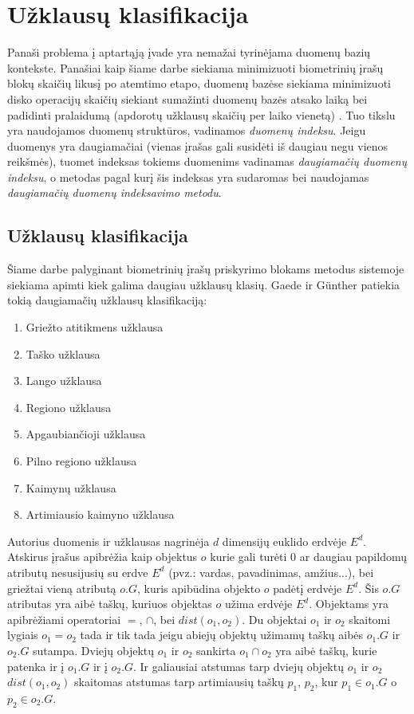 \section{Užklausų klasifikacija}

Panaši problema į aptartąją įvade yra nemažai tyrinėjama duomenų bazių kontekste.
Panašiai kaip šiame darbe siekiama minimizuoti biometrinių įrašų blokų skaičių likusį po atemtimo etapo, duomenų bazėse siekiama minimizuoti disko operacijų skaičių siekiant sumažinti duomenų bazės atsako laiką bei padidinti pralaidumą (apdorotų užklausų skaičių per laiko vienetą) \cite{garcia2000database}.
Tuo tikslu yra naudojamos duomenų struktūros, vadinamos {\it duomenų indeksu}.
Jeigu duomenys yra daugiamačiai (vienas įrašas gali susidėti iš daugiau negu vienos reikšmės), tuomet indeksas tokiems duomenims vadinamas {\it daugiamačių duomenų indeksu}, o metodas pagal kurį šis indeksas yra sudaromas bei naudojamas {\it daugiamačių duomenų indeksavimo metodu}.

\subsection{Užklausų klasifikacija}

Šiame darbe palyginant biometrinių įrašų priskyrimo blokams metodus sistemoje \cite{NeurotechnologyMegamatcherAccelerator} siekiama apimti kiek galima daugiau užklausų klasių.
Gaede ir Günther \cite{gaede1998multidimensional} patiekia tokią daugiamačių užklausų klasifikaciją:
\begin{enumerate}
	\item Griežto atitikmens užklausa
	\item Taško užklausa
	\item Lango užklausa
	\item Regiono užklausa
	\item Apgaubiančioji užklausa
	\item Pilno regiono užklausa
	\item Kaimynų užklausa
	\item Artimiausio kaimyno užklausa
\end{enumerate}

Autorius duomenis ir užklausas nagrinėja $d$ dimensijų euklido erdvėje $E^d$.
Atskirus įrašus apibrėžia kaip objektus $o$ kurie gali turėti 0 ar daugiau papildomų atributų nesusijusių su erdve $E^d$ (pvz.: vardas, pavadinimas, amžius...), bei griežtai vieną atributą $o.G$, kuris apibūdina objekto $o$ padėtį erdvėje $E^d$.
Šis $o.G$ atributas yra aibė taškų, kuriuos objektas $o$ užima erdvėje $E^d$.
Objektams yra apibrėžiami operatoriai $=$, $\cap$, bei $dist(o_1, o_2)$.
Du objektai $o_1$ ir $o_2$ skaitomi lygiais $o_1 = o_2$ tada ir tik tada jeigu abiejų objektų užimamų taškų aibės $o_1.G$ ir $o_2.G$ sutampa.
Dviejų objektų $o_1$ ir $o_2$ sankirta $o_1 \cap o_2$ yra aibė taškų, kurie patenka ir į $o_1.G$ ir į $o_2.G$.
Ir galiausiai atstumas tarp dviejų objektų $o_1$ ir $o_2$ $dist(o_1, o_2)$ skaitomas atstumas tarp artimiausių taškų $p_1$, $p_2$, kur $p_1 \in o_1.G$ o $p_2 \in o_2.G$.



